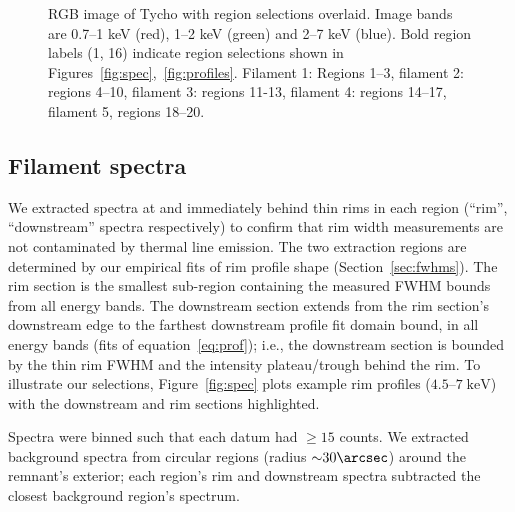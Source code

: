 \documentclass[manuscript]{aastex}  %
\newcommand*{\mt}{\mathrm}
\newcommand*{\unit}[1]{\;\mt{#1}}  %
\newcommand*{\abt}{\mathord{\sim}} %
\begin{document}
\begin{figure}
    \centering
    \iftoggle{manuscript}{
        \texttt{[image: figures/snr-inv.png]}
    }{
        \plotone{figures/snr-inv.png}
    }
    \caption{RGB image of Tycho with region selections overlaid.  Image bands
    are 0.7--1 keV (red), 1--2 keV (green) and 2--7 keV (blue).  Bold region
    labels (1, 16) indicate region selections shown in
    Figures~\ref{fig:spec},~\ref{fig:profiles}.  Filament 1: Regions 1--3,
    filament 2: regions 4--10, filament 3: regions 11-13, filament 4:
    regions 14--17, filament 5, regions 18--20.
    \label{fig:snr}}
\end{figure}

\subsection{Filament spectra}
\label{sec:spec}

We extracted spectra at and immediately behind thin rims in each region
(``rim'', ``downstream'' spectra respectively) to confirm that rim width
measurements are not contaminated by thermal line emission.  The two extraction
regions are determined by our empirical fits of rim profile shape
(Section~\ref{sec:fwhms}).  The rim section is the smallest sub-region
containing the measured FWHM bounds from all energy bands.  The downstream
section extends from the rim section's downstream edge to the farthest
downstream profile fit domain bound, in all energy bands (fits of
equation~\eqref{eq:prof}); i.e., the downstream section is bounded by the thin
rim FWHM and the intensity plateau/trough behind the rim.  To illustrate our
selections, Figure~\ref{fig:spec} plots example rim profiles ($4.5$--$7
\unit{keV}$) with the downstream and rim sections highlighted.

Spectra were binned such that each datum had $\geq 15$ counts.  We extracted
background spectra from circular regions (radius $\abt 30\arcsec$) around the
remnant's exterior; each region's rim and downstream spectra subtracted the
closest background region's spectrum.
\end{document}
